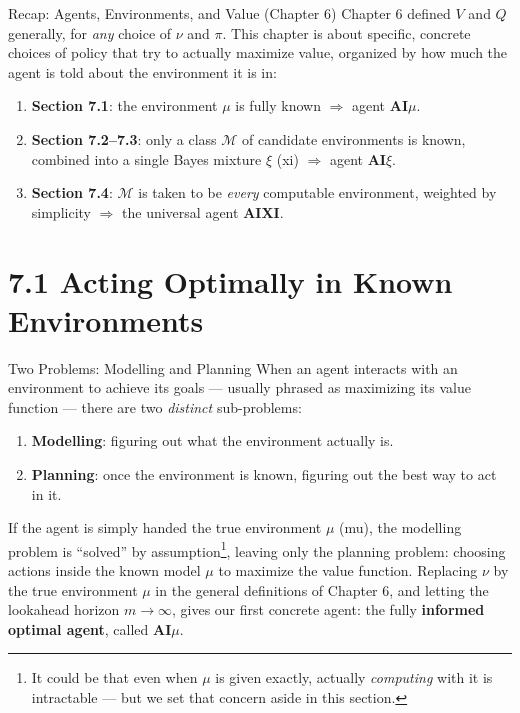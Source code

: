 \documentclass[aspectratio=169,10pt]{beamer}
\newcommand{\Mcal}{\mathcal{M}}
\begin{document}
\begin{frame}[allowframebreaks]{Recap: Agents, Environments, and Value (Chapter 6)}
  \framebreak
  Chapter 6 defined $V$ and $Q$ generally, for \emph{any} choice of $\nu$ and
  $\pi$. This chapter is about specific, concrete choices of policy that try
  to actually maximize value, organized by how much the agent is told about
  the environment it is in:
  \begin{enumerate}
    \item \textbf{Section 7.1}: the environment $\mu$ is fully known
      $\Rightarrow$ agent \textbf{AI$\mu$}.
    \item \textbf{Section 7.2--7.3}: only a class $\Mcal$ of candidate
      environments is known, combined into a single Bayes mixture $\xi$
      (xi) $\Rightarrow$ agent \textbf{AI$\xi$}.
    \item \textbf{Section 7.4}: $\Mcal$ is taken to be \emph{every}
      computable environment, weighted by simplicity $\Rightarrow$ the
      universal agent \textbf{AIXI}.
  \end{enumerate}
\end{frame}

\section{7.1 Acting Optimally in Known Environments}

\begin{frame}{Two Problems: Modelling and Planning}
  When an agent interacts with an environment to achieve its goals ---
  usually phrased as maximizing its value function --- there are two
  \emph{distinct} sub-problems:
  \begin{enumerate}
    \item \textbf{Modelling}: figuring out what the environment actually is.
    \item \textbf{Planning}: once the environment is known, figuring out
      the best way to act in it.
  \end{enumerate}
  If the agent is simply handed the true environment $\mu$ (mu), the
  modelling problem is ``solved'' by assumption\footnote{It could be that
  even when $\mu$ is given exactly, actually \emph{computing} with it is
  intractable --- but we set that concern aside in this section.}, leaving
  only the planning problem: choosing actions inside the known model $\mu$
  to maximize the value function. Replacing $\nu$ by the true environment
  $\mu$ in the general definitions of Chapter 6, and letting the lookahead
  horizon $m\to\infty$, gives our first concrete agent: the fully
  \textbf{informed optimal agent}, called \textbf{AI$\mu$}.
\end{frame}
\end{document}
